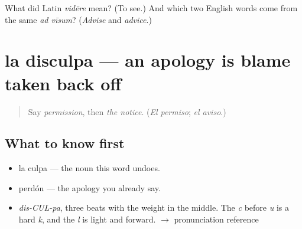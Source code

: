 \begin{tcolorbox}[breakable,colback=teal!4,colframe=teal!35!black,title={Before you move on}]
What did Latin \emph{vidēre} mean? (To see.) And which two English words come from the same \emph{ad vīsum}? (\emph{Advise} and \emph{advice}.)
\end{tcolorbox}
\section[la disculpa]{la disculpa — an apology is blame taken back off}

\label{lesson:ES-C332-disculpa}



\begin{quote}
Say \emph{permission}, then \emph{the notice}. (\emph{El permiso}; \emph{el aviso}.)
\end{quote}

\subsection*{What to know first}
\begin{itemize}
\raggedright
  \item la culpa — the noun this word undoes.
  \item perdón — the apology you already say.
\end{itemize}

\begin{sounds}
\begin{itemize}
\raggedright
  \item \emph{dis-CUL-pa}, three beats with the weight in the middle. The \emph{c} before \emph{u} is a hard \emph{k}, and the \emph{l} is light and forward. $\to$ pronunciation reference
\end{itemize}
\end{sounds}

